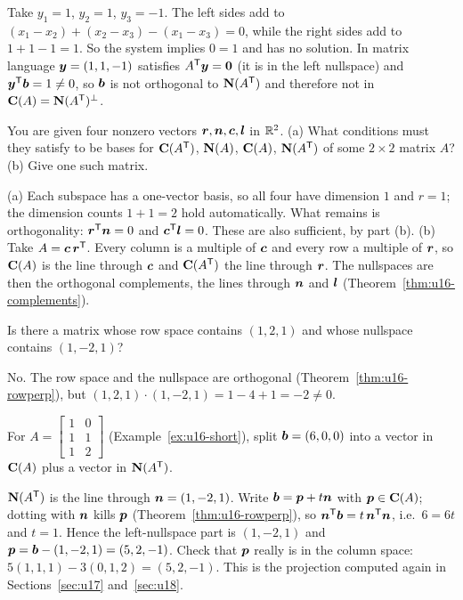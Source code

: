 \begin{solution}
Take $y_1=1$, $y_2=1$, $y_3=-1$. The left sides add to
$(x_1-x_2)+(x_2-x_3)-(x_1-x_3)=0$, while the right sides add to $1+1-1=1$. So the system
implies $0=1$ and has no solution. In matrix language $\boldsymbol{y}=(1,1,-1)$ satisfies
$A^{\mathsf{T}}\boldsymbol{y}=\boldsymbol{0}$ (it is in the left nullspace) and $\boldsymbol{y}^{\mathsf{T}}\boldsymbol{b}=1\neq 0$, so $\boldsymbol{b}$ is
not orthogonal to $\mathbf{N}(A^{\mathsf{T}})$ and therefore not in $\mathbf{C}(A)=\mathbf{N}(A^{\mathsf{T}})^{\perp}$.
\end{solution}

\begin{exercise}\label{ex:u16-four}
You are given four nonzero vectors $\boldsymbol{r},\boldsymbol{n},\boldsymbol{c},\boldsymbol{l}$ in $\mathbb{R}^2$.
(a) What conditions must they satisfy to be bases for $\mathbf{C}(A^{\mathsf{T}})$, $\mathbf{N}(A)$, $\mathbf{C}(A)$,
$\mathbf{N}(A^{\mathsf{T}})$ of some $2\times 2$ matrix $A$? (b) Give one such matrix.
\end{exercise}

\begin{solution}
(a) Each subspace has a one-vector basis, so all four have dimension $1$ and $r=1$; the
dimension counts $1+1=2$ hold automatically. What remains is orthogonality:
$\boldsymbol{r}^{\mathsf{T}}\boldsymbol{n}=0$ and $\boldsymbol{c}^{\mathsf{T}}\boldsymbol{l}=0$. These are also sufficient, by part (b).
(b) Take $A=\boldsymbol{c}\,\boldsymbol{r}^{\mathsf{T}}$. Every column is a multiple of $\boldsymbol{c}$ and every row a multiple
of $\boldsymbol{r}$, so $\mathbf{C}(A)$ is the line through $\boldsymbol{c}$ and $\mathbf{C}(A^{\mathsf{T}})$ the line through
$\boldsymbol{r}$. The nullspaces are then the orthogonal complements, the lines through $\boldsymbol{n}$ and
$\boldsymbol{l}$ (Theorem~\ref{thm:u16-complements}).
\end{solution}

\begin{exercise}\label{ex:u16-impossible}
Is there a matrix whose row space contains $(1,2,1)$ and whose nullspace contains
$(1,-2,1)$?
\end{exercise}

\begin{solution}
No. The row space and the nullspace are orthogonal (Theorem~\ref{thm:u16-rowperp}), but
$(1,2,1)\cdot(1,-2,1)=1-4+1=-2\neq 0$.
\end{solution}

\begin{exercise}\label{ex:u16-splitb}
For $A=\begin{bmatrix}1&0\\1&1\\1&2\end{bmatrix}$ (Example~\ref{ex:u16-short}), split
$\boldsymbol{b}=(6,0,0)$ into a vector in $\mathbf{C}(A)$ plus a vector in $\mathbf{N}(A^{\mathsf{T}})$.
\end{exercise}

\begin{solution}
$\mathbf{N}(A^{\mathsf{T}})$ is the line through $\boldsymbol{n}=(1,-2,1)$. Write $\boldsymbol{b}=\boldsymbol{p}+t\boldsymbol{n}$ with
$\boldsymbol{p}\in\mathbf{C}(A)$; dotting with $\boldsymbol{n}$ kills $\boldsymbol{p}$ (Theorem~\ref{thm:u16-rowperp}), so
$\boldsymbol{n}^{\mathsf{T}}\boldsymbol{b}=t\,\boldsymbol{n}^{\mathsf{T}}\boldsymbol{n}$, i.e.\ $6=6t$ and $t=1$. Hence the left-nullspace part is
$(1,-2,1)$ and $\boldsymbol{p}=\boldsymbol{b}-(1,-2,1)=(5,2,-1)$. Check that $\boldsymbol{p}$ really is in the column
space: $5(1,1,1)-3(0,1,2)=(5,2,-1)$. This is the projection computed again in
Sections~\ref{sec:u17} and~\ref{sec:u18}.
\end{solution}
